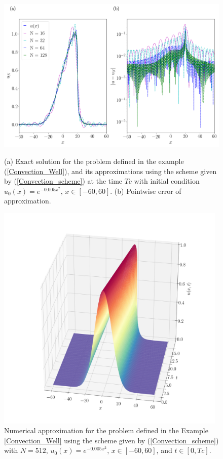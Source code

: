 	\begin{figure}[H]
		\centering	
		\includegraphics[width=13cm]{Figures/Numerical_Solution_Inviscid_T.png}
		\caption{(a) Exact solution for the problem defined in the example (\ref{Convection_Well}), and its approximations using the scheme given by (\ref{Convection_scheme}) at the time $Tc$ with initial condition $u_0(x) = e^{-0.005x^2}$, $x \in [-60, 60]$. (b) Pointwise error of approximation.}
		\label{convection_aprox_T}
		\includegraphics[width=11cm]{Figures/Numerical_Solution_Inviscid.png}
		\caption{Numerical approximation for the problem defined in the Example \ref{Convection_Well} using the scheme given by (\ref{Convection_scheme}) with $N=512$, $u_0(x) = e^{-0.005x^2}$, $x \in [-60, 60]$, and $t \in [0, Tc]$.}
	\end{figure}
	
